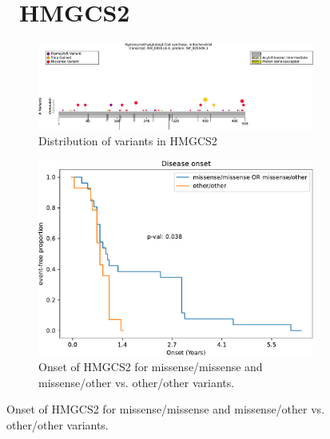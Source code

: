 \begin{figure}[htbp]
\section*{ HMGCS2}
\centering
\begin{subfigure}[b]{0.95\textwidth}
\centering
\includegraphics[width=\textwidth]{ img/HMGCS2_protein_diagram.pdf} 
\captionsetup{justification=raggedright,singlelinecheck=false}
\caption{Distribution of variants in HMGCS2}
\end{subfigure}

\vspace{2em}

\begin{subfigure}[b]{0.35\textwidth}
    \centering
    \includegraphics[width=\textwidth]{ img/HMGCS2_stats.pdf} 
    \captionsetup{justification=raggedright,singlelinecheck=false}
    \caption{Onset of HMGCS2 for missense/missense and missense/other vs. other/other variants.}
    \end{subfigure}
    
    \vspace{2em}


\end{figure}
